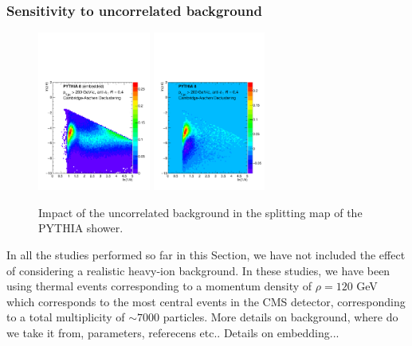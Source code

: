 \subsubsection{Sensitivity to uncorrelated background}
\label{sec:uncorrelatedbackground}

\begin{figure}[th]
\centering
\includegraphics[width=0.33\textwidth]
{figures/LundMC/PythiaEmb_CA}%
\includegraphics[width=0.33\textwidth]
{figures/LundMC/PythiaDiff_CA}%
\caption{Impact of the uncorrelated background in the splitting map of the PYTHIA shower.}
\label{fig:UncorrelatedBkg}
\end{figure}

In all the studies performed so far in this Section, we have not included the effect of considering a realistic heavy-ion background. In these studies, we have been using thermal events corresponding to a momentum density of $\rho =120$ GeV which corresponds to the most central events in the CMS detector, corresponding to a total multiplicity of $\sim 7000$ particles. 
{\color{red} More details on background, where do we take it from, parameters,  referecens etc.. Details on embedding...}

